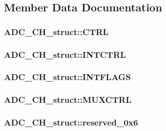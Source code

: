 \subsection{Member Data Documentation}
\hypertarget{struct_a_d_c___c_h__struct_a93d0ad00eafa073687ee9d77727f6b71}{
\subsubsection[{CTRL}]{ {\bf ADC\_\-CH\_\-struct::CTRL}}}
\label{struct_a_d_c___c_h__struct_a93d0ad00eafa073687ee9d77727f6b71}
\hypertarget{struct_a_d_c___c_h__struct_aa4edf87afea8607ca769c7644077f53b}{
\subsubsection[{INTCTRL}]{ {\bf ADC\_\-CH\_\-struct::INTCTRL}}}
\label{struct_a_d_c___c_h__struct_aa4edf87afea8607ca769c7644077f53b}
\hypertarget{struct_a_d_c___c_h__struct_a05abbe1a86ed1ab85ecd3d1c65828e7d}{
\subsubsection[{INTFLAGS}]{ {\bf ADC\_\-CH\_\-struct::INTFLAGS}}}
\label{struct_a_d_c___c_h__struct_a05abbe1a86ed1ab85ecd3d1c65828e7d}
\hypertarget{struct_a_d_c___c_h__struct_afcc2633eeff22d3cc02bdda1c6b3070f}{
\subsubsection[{MUXCTRL}]{ {\bf ADC\_\-CH\_\-struct::MUXCTRL}}}
\label{struct_a_d_c___c_h__struct_afcc2633eeff22d3cc02bdda1c6b3070f}
\hypertarget{struct_a_d_c___c_h__struct_af653adc54953386f00d623f98610bf7c}{
\subsubsection[{reserved\_\-0x6}]{ {\bf ADC\_\-CH\_\-struct::reserved\_\-0x6}}}
